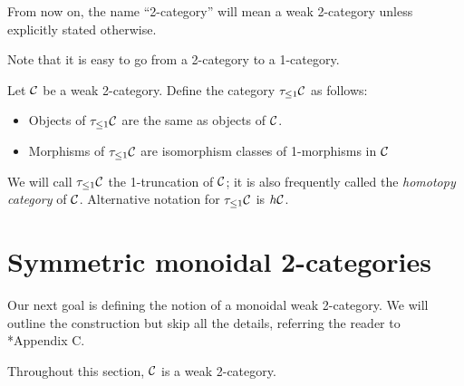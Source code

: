 \begin{convention}
  From now on, the name ``2-category'' will mean a weak 2-category unless
  explicitly stated otherwise.
\end{convention}
Note that it is easy to go from a 2-category to a 1-category.
\begin{definition}\label{d:hC}
  Let $\mathcal{C}$ be a weak 2-category. Define the category $\tau_{\leq 1}\mathcal{C}$
  as follows:
  \begin{itemize}
    \item Objects of $\tau_{\leq 1}\mathcal{C}$ are the same as objects of $\mathcal{C}$.
    \item Morphisms of $\tau_{\leq 1}\mathcal{C}$ are isomorphism classes of 1-morphisms in
    $\mathcal{C}$
  \end{itemize}
  We will call $\tau_{\leq 1}\mathcal{C}$ the 1-truncation of $\mathcal{C}$; it is also frequently
  called the  \emph{homotopy category} of $\mathcal{C}$.
  Alternative notation for $\tau_{\leq 1}\mathcal{C}$ is $h\mathcal{C}$.
\end{definition}

\section{Symmetric monoidal 2-categories}\label{s:sym-mon-2cat}


Our next goal is defining the notion of a monoidal weak 2-category. We will
outline the construction but skip all the details, referring the reader to
*{Appendix C}.

Throughout this section, $\mathcal{C}$ is a weak 2-category.

